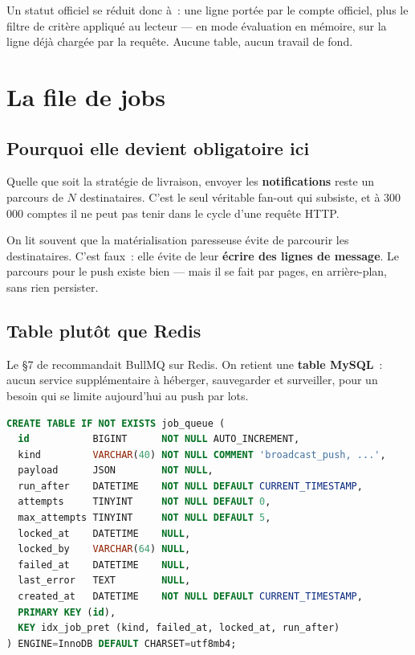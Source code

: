 Un statut officiel se réduit donc à~: une ligne  portée par le compte officiel,
plus le filtre de critère appliqué au lecteur --- en mode évaluation en mémoire, sur la ligne
 déjà chargée par la requête. Aucune table, aucun travail de fond.

\chapter{La file de jobs}

\section{Pourquoi elle devient obligatoire ici}

Quelle que soit la stratégie de livraison, envoyer les \textbf{notifications} reste un
parcours de $N$ destinataires. C'est le seul véritable fan-out qui subsiste, et à 300\,000
comptes il ne peut pas tenir dans le cycle d'une requête HTTP.

\begin{note}
On lit souvent que la matérialisation paresseuse évite de parcourir les destinataires. C'est
faux~: elle évite de leur \textbf{écrire des lignes de message}. Le parcours pour le push
existe bien --- mais il se fait par pages, en arrière-plan, sans rien persister.
\end{note}

\section{Table plutôt que Redis}

Le §7 de  recommandait BullMQ sur Redis. On retient une
\textbf{table MySQL}~: aucun service supplémentaire à héberger, sauvegarder et surveiller,
pour un besoin qui se limite aujourd'hui au push par lots.

\begin{lstlisting}[language=SQL, caption={File de jobs --- même migration 025}]
CREATE TABLE IF NOT EXISTS job_queue (
  id           BIGINT      NOT NULL AUTO_INCREMENT,
  kind         VARCHAR(40) NOT NULL COMMENT 'broadcast_push, ...',
  payload      JSON        NOT NULL,
  run_after    DATETIME    NOT NULL DEFAULT CURRENT_TIMESTAMP,
  attempts     TINYINT     NOT NULL DEFAULT 0,
  max_attempts TINYINT     NOT NULL DEFAULT 5,
  locked_at    DATETIME    NULL,
  locked_by    VARCHAR(64) NULL,
  failed_at    DATETIME    NULL,
  last_error   TEXT        NULL,
  created_at   DATETIME    NOT NULL DEFAULT CURRENT_TIMESTAMP,
  PRIMARY KEY (id),
  KEY idx_job_pret (kind, failed_at, locked_at, run_after)
) ENGINE=InnoDB DEFAULT CHARSET=utf8mb4;
\end{lstlisting}

